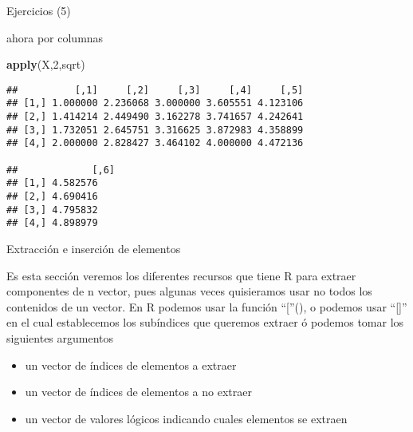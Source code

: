 \documentclass[ignorenonframetext,]{beamer}
\newenvironment{Shaded}{\begin{snugshade}}{\end{snugshade}}
\newcommand{\KeywordTok}[1]{\textcolor[rgb]{0.13,0.29,0.53}{\textbf{#1}}}
\newcommand{\DecValTok}[1]{\textcolor[rgb]{0.00,0.00,0.81}{#1}}
\newcommand{\NormalTok}[1]{#1}
\begin{document}
\begin{frame}[fragile]{Ejercicios (5)}

ahora por columnas

\begin{Shaded}
\begin{Highlighting}[]
\KeywordTok{apply}\NormalTok{(X,}\DecValTok{2}\NormalTok{,sqrt)}
\end{Highlighting}
\end{Shaded}

\begin{verbatim}
##          [,1]     [,2]     [,3]     [,4]     [,5]    
## [1,] 1.000000 2.236068 3.000000 3.605551 4.123106 
## [2,] 1.414214 2.449490 3.162278 3.741657 4.242641 
## [3,] 1.732051 2.645751 3.316625 3.872983 4.358899 
## [4,] 2.000000 2.828427 3.464102 4.000000 4.472136 

##             [,6]
## [1,] 4.582576
## [2,] 4.690416
## [3,] 4.795832
## [4,] 4.898979
\end{verbatim}

\end{frame}

\begin{frame}{Extracción e inserción de elementos}

Es esta sección veremos los diferentes recursos que tiene R para extraer
componentes de n vector, pues algunas veces quisieramos usar no todos
los contenidos de un vector. En R podemos usar la función ``{[}''(), o
podemos usar ``{[}{]}'' en el cual establecemos los subíndices que
queremos extraer ó podemos tomar los siguientes argumentos

\begin{itemize}
\item
  un vector de índices de elementos a extraer
\item
  un vector de índices de elementos a no extraer
\item
  un vector de valores lógicos indicando cuales elementos se extraen
\end{itemize}

\end{frame}
\end{document}
